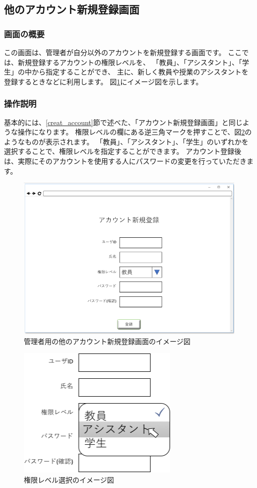 \newpage

\subsection{他のアカウント新規登録画面}
\subsubsection{画面の概要}
この画面は、管理者が自分以外のアカウントを新規登録する画面です。
ここでは、新規登録するアカウントの権限レベルを、
「教員」、「アシスタント」、「学生」の中から指定することができ、
主に、新しく教員や授業のアシスタントを登録するときなどに利用します。
図\ref{fig:07}にイメージ図を示します。

\subsubsection{操作説明}
基本的には、\ref{creat_account}節で述べた、「アカウント新規登録画面」と同じような操作になります。
権限レベルの欄にある逆三角マークを押すことで、図\ref{fig:08}のようなものが表示されます。
「教員」、「アシスタント」、「学生」のいずれかを選択することで、権限レベルを指定することができます。
アカウント登録後は、実際にそのアカウントを使用する人にパスワードの変更を行っていただきます。

\begin{figure}[phtbp]
  \begin{center}
    \includegraphics[width=0.6\linewidth,clip]{./img/07.png}
    \caption{管理者用の他のアカウント新規登録画面のイメージ図}\label{fig:07}
  \end{center}
\end{figure}

\begin{figure}[phtbp]
  \begin{center}
    \includegraphics[width=0.27\linewidth,clip]{./img/08_.png}
    \caption{権限レベル選択のイメージ図}\label{fig:08}
  \end{center}
\end{figure}

